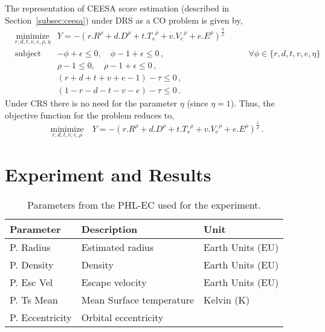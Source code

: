 \documentclass[10pt]{article}
\begin{document}
The representation of CEESA score estimation (described in Section~\ref{subsec:ceesa}) under DRS as a CO problem is
given by,
\begin{equation}\label{eq:ceesadrs}
  \begin{aligned}
    & \underset{r,d,t,v,e,\rho,\eta}{\text{minimize}}
    & Y = {-}{(r.R^\rho+d.D^\rho+t.{T_s}^\rho+v.{V_e}^\rho+e.E^\rho)}^{\frac{\eta}{\rho}}\\
    & \text{subject to}
    &   {-}\phi + \epsilon \leq 0,\quad\phi - 1 + \epsilon \leq 0\,, &\quad\quad \forall \phi\in\{r,d,t,v,e,\eta\}\\
    && \rho - 1 \leq 0,\quad \rho - 1 + \epsilon \leq 0\,,\\
    && (r+d+t+v+e-1) - \tau \leq 0\,,\\
    && (1-r-d-t-v-e) - \tau \leq 0\,.
  \end{aligned}
\end{equation}
Under CRS there is no need for the parameter $\eta$ (since $\eta=1$). Thus, the objective function for the problem reduces to,
\begin{equation}\label{eq:ceesacrs}
  \underset{r,d,t,v,e,\rho}{\text{minimize}}\quad
  Y = {-}{(r.R^\rho+d.D^\rho+t.{T_s}^\rho+v.{V_e}^\rho+e.E^\rho)}^{\frac{1}{\rho}}\,.
\end{equation}


\section{Experiment and Results}\label{sec:results}

\begin{table}
  \begin{center}
    \begin{tabular}{l l l}
      \toprule
      \textbf{Parameter} & \textbf{Description} & \textbf{Unit}\\
      \midrule
      P. Radius       & Estimated radius         & Earth Units (EU)\\
      P. Density      & Density                  & Earth Units (EU)\\
      P. Esc Vel      & Escape velocity          & Earth Units (EU)\\
      P. Ts Mean      & Mean Surface temperature & Kelvin (K)\\
      P. Eccentricity & Orbital eccentricity\\
      \bottomrule
    \end{tabular}
  \end{center}
  \caption{Parameters from the PHL-EC used for the experiment.}\label{tab:param}
\end{table}
\end{document}
